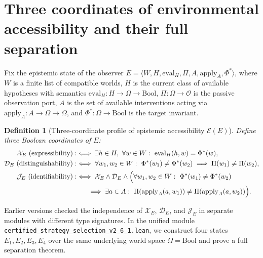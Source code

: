 \documentclass[11pt,a4paper]{article}
\theoremstyle{cleanthm}
\newtheorem{definition}{Definition}[section]
\DeclareRobustCommand{\id}[1]{\allowbreak\nolinkurl{#1}\allowbreak}
\begin{document}
\section{Three coordinates of environmental accessibility and their full separation}
Fix the epistemic state of the observer $E=\langle W,H,\mathrm{eval}_H,\Pi,A,\mathrm{apply}_A,\Phi^*\rangle$, where $W$ is a finite list of compatible worlds, $H$ is the current class of available hypotheses with semantics $\mathrm{eval}_H:H\to\Omega\to\mathrm{Bool}$, $\Pi:\Omega\to\mathcal O$ is the passive observation port, $A$ is the set of available interventions acting via $\mathrm{apply}_A:A\to\Omega\to\Omega$, and $\Phi^*:\Omega\to\mathrm{Bool}$ is the target invariant.

\begin{definition}[Three-coordinate profile of epistemic accessibility $\mathcal E(E)$]
Define three Boolean coordinates of $E$:
\begin{align}
\mathcal X_E\ \text{(expressibility)} &:\iff \exists h\in H,\ \forall w\in W:\ \mathrm{eval}_H(h,w)=\Phi^*(w),\\
\mathcal D_E\ \text{(distinguishability)} &:\iff \forall w_1,w_2\in W:\ \Phi^*(w_1)\ne\Phi^*(w_2)\implies\Pi(w_1)\ne\Pi(w_2),\\
\mathcal J_E\ \text{(identifiability)} &:\iff \mathcal X_E\land\mathcal D_E\land
\Bigl(\forall w_1,w_2\in W:\ \Phi^*(w_1)\ne\Phi^*(w_2)\nonumber\\
&\qquad\implies \exists a\in A:\ \Pi(\mathrm{apply}_A(a,w_1))\ne\Pi(\mathrm{apply}_A(a,w_2))\Bigr).
\end{align}
\end{definition}
Earlier versions checked the independence of $\mathcal X_E$, $\mathcal D_E$, and $\mathcal J_E$ in separate modules with different type signatures. In the unified module \id{certified_strategy_selection_v2_6_1.lean}, we construct four states $E_1,E_2,E_3,E_4$ over the same underlying world space $\Omega=\mathrm{Bool}$ and prove a full separation theorem.
\end{document}
